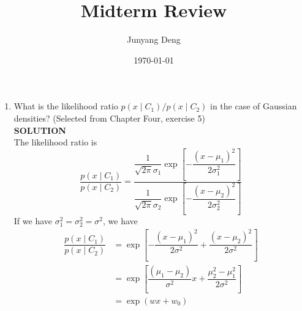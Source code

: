 \documentclass{article}
\title{Midterm Review}
\author{Junyang Deng}
\date{\today}
\begin{document}
 
\maketitle

\begin{enumerate}
    \item What is the likelihood ratio $p\left(x \mid C_1\right) / p\left(x \mid C_2\right)$ in the case of Gaussian densities? (Selected from Chapter Four, exercise 5)\\
    \textbf{SOLUTION}\\
    The likelihood ratio is
$$
\dfrac{p\left(x \mid C_1\right)}{p\left(x \mid C_2\right)}=\dfrac{\dfrac{1}{\sqrt{2 \pi} \sigma_1} \exp \left[-\dfrac{\left(x-\mu_1\right)^2}{2 \sigma_1^2}\right]}{\dfrac{1}{\sqrt{2 \pi} \sigma_2} \exp \left[-\dfrac{\left(x-\mu_2\right)^2}{2 \sigma_2^2}\right]}
$$
If we have $\sigma_1^2=\sigma_2^2=\sigma^2$, we have
$$
\begin{aligned}
\dfrac{p\left(x \mid C_1\right)}{p\left(x \mid C_2\right)} &=\exp \left[-\dfrac{\left(x-\mu_1\right)^2}{2 \sigma^2}+\dfrac{\left(x-\mu_2\right)^2}{2 \sigma^2}\right] \\
&=\exp \left[\dfrac{\left(\mu_1-\mu_2\right)}{\sigma^2} x+\dfrac{\mu_2^2-\mu_1^2}{2 \sigma^2}\right] \\
&=\exp \left(w x+w_0\right)
\end{aligned}
$$


\end{enumerate}
\end{document}
